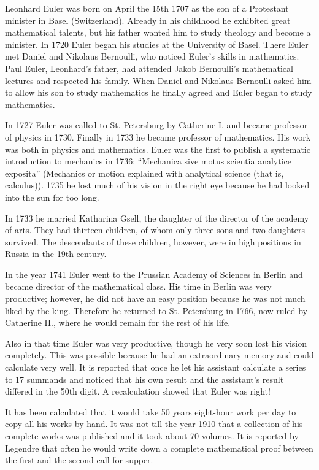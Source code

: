 \documentclass[12pt]{article}
\begin{document}
Leonhard Euler was born on April the 15th 1707 as the son of a Protestant minister in Basel (Switzerland). Already in his childhood he exhibited great mathematical talents, but his father wanted him to study theology and become a minister. In 1720 Euler began his studies at the University of Basel. There Euler met Daniel and Nikolaus Bernoulli, who noticed Euler's skills in mathematics. Paul Euler, Leonhard's father, had attended Jakob Bernoulli's mathematical lectures and respected his family.
When Daniel and Nikolaus Bernoulli asked him to allow his son to study mathematics he finally agreed and Euler began to study mathematics.

In 1727 Euler was called to St. Petersburg by Catherine I. and became professor of physics in 1730. Finally in 1733 he became professor of mathematics. His work was both in physics and mathematics. Euler was the first to publish a systematic introduction to mechanics in 1736: ``Mechanica sive motus scientia analytice exposita'' (Mechanics or motion explained with analytical science (that is, calculus)). 1735 he lost much of his vision in the right eye because he had looked into the sun for too long.

In 1733 he married Katharina Gsell, the daughter of the director of the academy of arts. They had thirteen children, of whom only three sons and two daughters survived. The descendants of these children, however, were in high positions in Russia in the 19th century.

In the year 1741 Euler went to the Prussian Academy of Sciences in Berlin and became director of the mathematical class. His time in Berlin was very productive; however, he did not have an easy position because he was not much liked by the king. Therefore he returned to St. Petersburg in 1766, now ruled by Catherine II., where he would remain for the rest of his life.

Also in that time Euler was very productive, though he very soon lost his vision completely. This was possible because he had an extraordinary memory and could calculate very well. It is reported that once he let his assistant calculate a series to 17 summands and noticed that his own result and the assistant's result differed in the 50th digit. A recalculation showed that Euler was right! 

It has been calculated that it would take 50 years eight-hour work per day to copy all his works by hand. It was not till the year 1910 that a collection of his complete works was published and it took about 70 volumes. It is reported by Legendre that often he would write down a complete mathematical proof between the first and the second call for supper.
\end{document}
